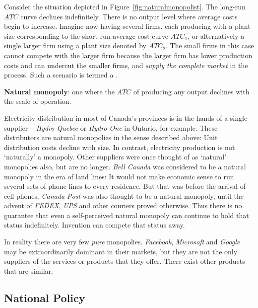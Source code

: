 Consider the situation depicted in Figure~\ref{fig:naturalmonopolist}. The
long-run $ATC$ curve declines indefinitely. There is no output level where
average costs begin to increase. Imagine now having several firms, each
producing with a plant size corresponding to the short-run average cost
curve $ATC_{1}$, or alternatively a single larger firm using a plant size
denoted by $ATC_{2}$. The small firms in this case cannot compete with the
larger firm because the larger firm has lower production costs and can
undercut the smaller firms, and \textit{supply the complete market} in the
process. Such a scenario is termed a .



\newhtmlpage

\begin{DefBox}
	\textbf{Natural monopoly}: one where the $ATC$ of producing any output declines with the scale of operation.
\end{DefBox}

Electricity distribution in most of Canada's provinces is in the hands of a
single supplier -- \textit{Hydro Quebec} or \textit{Hydro One} in Ontario, for example. These
distributors are natural monopolies in the sense described above: Unit
distribution costs decline with size. In contrast, electricity production is
not `naturally' a monopoly. Other suppliers were once thought of as
`natural' monopolies also, but are no longer. \textit{Bell
	Canada} was considered to be a natural monopoly in the era of land lines: It
would not make economic sense to run several sets of phone lines to every
residence. But that was before the arrival of cell phones. \textit{Canada
	Post} was also thought to be a natural monopoly, until the advent of 
\textit{FEDEX}, \textit{UPS} and other couriers proved otherwise. Thus there is no
guarantee that even a self-perceived natural monopoly can continue to hold
that status indefinitely. Invention can compete that status away.

In reality there are very few \textit{pure} monopolies. \textit{Facebook}, 
\textit{Microsoft} and \textit{Google} may be extraordinarily dominant in their
markets, but they are not the only suppliers of the services or products
that they offer. There exist other products that are similar.

\subsection*{National Policy}

